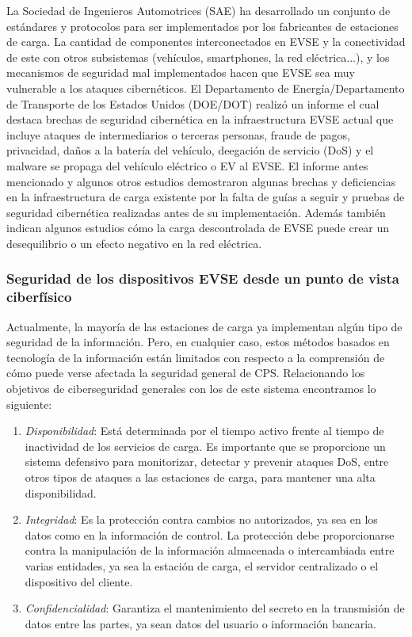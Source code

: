 \documentclass[12pt,a4paper,onecolumn,oneside]{report}
\begin{document}
La Sociedad de Ingenieros Automotrices (SAE) ha desarrollado un conjunto de estándares y protocolos para ser implementados por los fabricantes de estaciones de carga. La cantidad de componentes interconectados en EVSE y la conectividad de este con otros subsistemas (vehículos, smartphones, la red eléctrica...), y los mecanismos de seguridad mal implementados hacen que EVSE sea muy vulnerable a los ataques cibernéticos. El Departamento de Energía/Departamento de Transporte de los Estados Unidos (DOE/DOT) realizó un informe el cual destaca brechas de seguridad cibernética en la infraestructura EVSE actual que incluye ataques de intermediarios o terceras personas, fraude de pagos, privacidad, daños a la batería del vehículo, deegación de servicio (DoS) y el malware se propaga del vehículo eléctrico o EV al EVSE. El informe antes mencionado y algunos otros estudios \cite{once}\cite{doce}\cite{trece} demostraron algunas brechas y deficiencias en la infraestructura de carga existente por la falta de guías a seguir y pruebas de seguridad cibernética realizadas antes de su implementación. Además también indican algunos estudios cómo la carga descontrolada de EVSE puede crear un desequilibrio o un efecto negativo en la red eléctrica.


\subsubsection{Seguridad de los dispositivos EVSE desde un punto de vista ciberfísico}
\label{Seguridad de los dispositivos EVSE desde un punto de vista ciberfísico}

Actualmente, la mayoría de las estaciones de carga ya implementan algún tipo de seguridad de la información. Pero, en cualquier caso, estos métodos basados en tecnología de la información están limitados con respecto a la comprensión de cómo puede verse afectada la seguridad general de CPS. Relacionando los objetivos de ciberseguridad generales con los de este sistema encontramos lo siguiente:


\begin{enumerate}

\item \textit{Disponibilidad}: Está determinada por el tiempo activo frente al tiempo de inactividad de los servicios de carga. Es importante que se proporcione un sistema defensivo para monitorizar, detectar y prevenir ataques DoS, entre otros tipos de ataques a las estaciones de carga, para mantener una alta disponibilidad.
\item \textit{Integridad}: Es la protección contra cambios no autorizados, ya sea en los datos como en la información de control. La protección debe proporcionarse contra la manipulación de la información almacenada o intercambiada entre varias entidades, ya sea la estación de carga, el servidor centralizado o el dispositivo del cliente. 
\item \textit{Confidencialidad}: Garantiza el mantenimiento del secreto en la transmisión de datos entre las partes, ya sean datos del usuario o información bancaria.

\end{enumerate}
\end{document}
